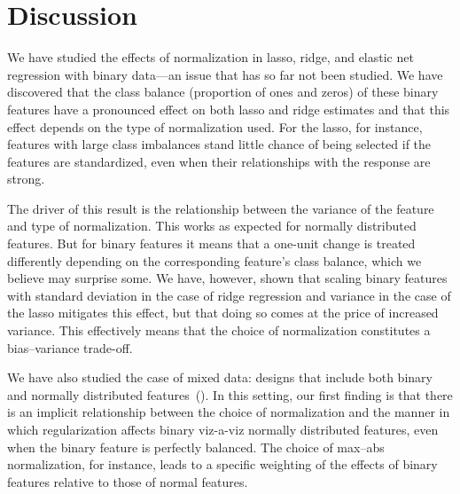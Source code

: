 \section{Discussion}

We have studied the effects of normalization in lasso, ridge, and elastic net regression
with binary data---an issue that has so far not been studied. We have discovered that the
class balance (proportion of ones and zeros) of these binary features have a pronounced
effect on both lasso and ridge estimates and that this effect depends on the type of
normalization used. For the lasso, for instance, features with large class imbalances stand
little chance of being selected if the features are standardized, even when their
relationships with the response are strong.

The driver of this result is the relationship between the variance of the feature and type
of normalization. This works as expected for normally distributed features. But for binary
features it means that a one-unit change is treated differently depending on the
corresponding feature's class balance, which we believe may surprise some. We have,
however, shown that scaling binary features with standard deviation in the case of ridge
regression and variance in the case of the lasso mitigates this effect, but that doing so
comes at the price of increased variance. This effectively means that the choice of
normalization constitutes a bias--variance trade-off.


We have also studied the case of mixed data: designs that include both binary and normally
distributed features~(). In this setting, our first finding is that
there is an implicit relationship between the choice of normalization and the manner in
which regularization affects binary viz-a-viz normally distributed features, even when the
binary feature is perfectly balanced. The choice of max--abs normalization, for instance,
leads to a specific weighting of the effects of binary features relative to those of normal
features.

